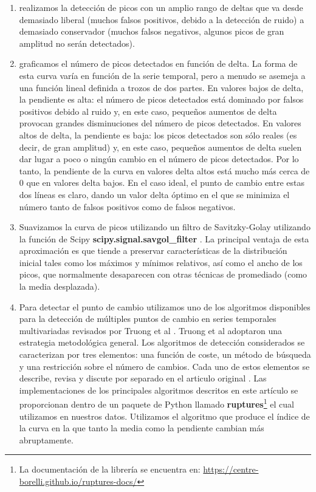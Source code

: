 \begin{enumerate}
\begin{itemize}
		\begin{enumerate}[label=(\roman*)]
			\item realizamos la detección de picos con un amplio rango de deltas  que va desde demasiado liberal (muchos falsos positivos, debido a la detección de ruido) a demasiado conservador (muchos falsos negativos, algunos picos de gran amplitud no serán detectados). 
			\item graficamos el número de picos detectados en función de delta. La forma de esta curva varía en función de la serie temporal, pero a menudo se asemeja a una función lineal definida a trozos  de dos partes. En valores bajos de delta, la pendiente es alta: el número de picos detectados  está dominado por falsos positivos debido al ruido y, en este caso, pequeños aumentos de delta provocan grandes disminuciones del número de picos detectados. En valores altos de delta, la pendiente es baja: los picos detectados  son sólo reales (es decir, de gran amplitud) y, en este caso, pequeños aumentos de delta suelen dar lugar a poco o ningún cambio en el número de picos detectados. Por lo tanto, la pendiente de la curva en valores delta altos está mucho más cerca de 0 que en valores delta bajos.  En el caso ideal, el punto de cambio entre estas dos líneas es claro, dando un valor delta óptimo en el que se minimiza el número tanto de falsos positivos como de falsos negativos. 
			\item Suavizamos la curva de picos utilizando un filtro de Savitzky-Golay utilizando la función de Scipy \textbf{scipy.signal.savgol\_filter} . La principal ventaja de esta aproximación es que tiende a preservar características de la distribución inicial tales como los máximos y mínimos relativos, así como el ancho de los picos, que normalmente desaparecen con otras técnicas de promediado (como la media desplazada).
			\item Para detectar el punto de cambio utilizamos uno de los algoritmos disponibles para la detección  de múltiples puntos de cambio en series temporales multivariadas revisados por  Truong et al \cite{truong_selective_2020}.   Truong et al adoptaron una estrategia metodológica general. Los algoritmos de detección considerados se caracterizan por tres elementos: una función de coste, un método de búsqueda y una restricción sobre el número de cambios. Cada uno de estos elementos se describe, revisa y discute por separado en el articulo original  \cite{truong_selective_2020}. Las implementaciones de los principales algoritmos descritos en este artículo se proporcionan dentro de un paquete de Python llamado \textbf{ruptures}\footnote{La documentación de la librería se encuentra en: \url{https://centre-borelli.github.io/ruptures-docs/}}  el cual utilizamos en nuestros datos. Utilizamos el algoritmo que produce  el índice de la curva en la que tanto la media como la pendiente cambian más abruptamente.
		\end{enumerate}
		

\end{itemize}
\end{enumerate}
